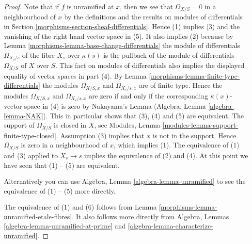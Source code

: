 \begin{proof}

Note that if $f$ is unramified at $x$, then
we see that $\Omega_{X/S} = 0$ in a neighbourhood of $x$
by the definitions and the results on modules of differentials
in Section \ref{morphisms-section-sheaf-differentials}. Hence (1) implies
(3) and the vanishing of the right hand vector space in (5).
It also implies (2) because by
Lemma \ref{morphisms-lemma-base-change-differentials}
the module of differentials $\Omega_{X_s/s}$ of the fibre $X_s$
over $\kappa(s)$ is the pullback of the module of differentials
$\Omega_{X/S}$ of $X$ over $S$. This fact on modules of differentials
also implies the displayed equality of vector spaces in part (4). By
Lemma \ref{morphisms-lemma-finite-type-differentials}
the modules $\Omega_{X/S, x}$ and $\Omega_{X_s/s, x}$ are of finite type.
Hence the modules $\Omega_{X/S, x}$ and $\Omega_{X_s/s, x}$ are zero if and only
if the corresponding $\kappa(x)$-vector space in (4) is zero by
Nakayama's Lemma
(Algebra, Lemma \ref{algebra-lemma-NAK}).
This in particular shows that (3), (4) and (5) are equivalent.
The support of $\Omega_{X/S}$ is closed in $X$, see
Modules, Lemma \ref{modules-lemma-support-finite-type-closed}.
Assumption (3) implies that $x$ is not in the support.
Hence $\Omega_{X/S}$ is zero in a neighbourhood of $x$, which
implies (1). The equivalence of (1) and (3) applied to $X_s \to s$
implies the equivalence of (2) and (4).
At this point we have seen that (1) -- (5) are equivalent.

\medskip\noindent
Alternatively you can use Algebra, Lemma \ref{algebra-lemma-unramified}
to see the equivalence of (1) -- (5) more directly.

\medskip\noindent
The equivalence of (1) and (6) follows from Lemma
\ref{morphisms-lemma-unramified-etale-fibres}.
It also follows more directly from
Algebra, Lemmas \ref{algebra-lemma-unramified-at-prime} and
\ref{algebra-lemma-characterize-unramified}.
\end{proof}


